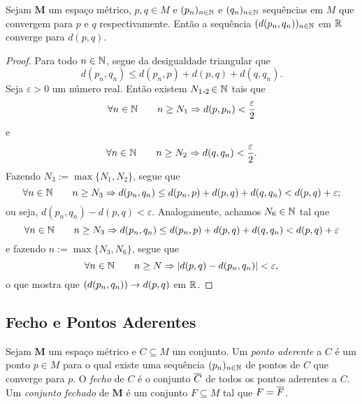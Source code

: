 \begin{prop}
Sejam $\bm M$ um espaço métrico, $p,q \in M$ e $(p_n)_{n \in \mathbb{N}}$ e $(q_n)_{n \in \mathbb{N}}$ sequências em $M$ que convergem para $p$ e $q$ respectivamente. Então a sequência $(d(p_n,q_n))_{n \in \mathbb{N}}$ em $\mathbb{R}$ converge para $d(p,q)$.
\end{prop}
\begin{proof}
	Para todo $n \in \mathbb{N}$, segue da desigualdade triangular que
	\begin{equation*}
	d(p_n,q_n) \leq d(p_n,p) + d(p,q) + d(q,q_n).
	\end{equation*}
Seja $\varepsilon > 0$ um número real. Então existem $N_1,_2 \in \mathbb{N}$ tais que
	\begin{equation*}
	\forall n \in \mathbb{N} \qquad n \geq N_1 \Rightarrow d(p,p_n) < \frac{\varepsilon}{2}
	\end{equation*}
e
	\begin{equation*}
	\forall n \in \mathbb{N} \qquad n \geq N_2 \Rightarrow d(q,q_n) < \frac{\varepsilon}{2}.
	\end{equation*}
Fazendo $N_3 := \max\{N_1,N_2\}$, segue que
	\begin{equation*}
	\forall n \in \mathbb{N} \qquad n \geq N_3 \Rightarrow d(p_n,q_n) \leq d(p_n,p) + d(p,q) + d(q,q_n) < d(p,q) + \varepsilon;
	\end{equation*}
ou seja, $d(p_n,q_n) - d(p,q) < \varepsilon$. Analogamente, achamos $N_6 \in \mathbb{N}$ tal que
	\begin{equation*}
	\forall n \in \mathbb{N} \qquad n \geq N_3 \Rightarrow d(p_n,q_n) \leq d(p_n,p) + d(p,q) + d(q,q_n) < d(p,q) + \varepsilon
	\end{equation*}
e fazendo $n := \max\{N_3,N_6\}$, segue que
	\begin{equation*}
	\forall n \in \mathbb{N} \qquad n \geq N \Rightarrow |d(p,q) - d(p_n,q_n)| < \varepsilon,
	\end{equation*}
o que mostra que $(d(p_n,q_n)) \rightarrow d(p,q)$ em $\mathbb{R}$.
	
\end{proof}

\subsection{Fecho e Pontos Aderentes}

\begin{defi}
Sejam $\bm M$ um espaço métrico e $C \subseteq M$ um conjunto. Um \emph{ponto aderente} a $C$ é um ponto $p \in M$ para o qual existe uma sequência $(p_n)_{n \in \mathbb{N}}$ de pontos de $C$ que converge para $p$. O \emph{fecho} de $C$ é o conjunto $\overline{C}$ de todos os pontos aderentes a $C$. Um \emph{conjunto fechado} de $\bm M$ é um conjunto $F \subseteq M$ tal que $F = \overline{F}$.
\end{defi}

